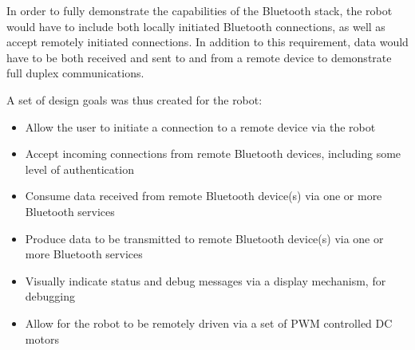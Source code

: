 In order to fully demonstrate the capabilities of the Bluetooth stack, the robot would have to include both locally initiated Bluetooth connections, as well as accept remotely initiated connections. In addition to this requirement, data would have to be both received and sent to and from a remote device to demonstrate full duplex communications.

A set of design goals was thus created for the robot:

\begin{itemize}
	\item Allow the user to initiate a connection to a remote device via the robot
	\item Accept incoming connections from remote Bluetooth devices, including some level of authentication
	\item Consume data received from remote Bluetooth device(s) via one or more Bluetooth services
	\item Produce data to be transmitted to remote Bluetooth device(s) via one or more Bluetooth services
	\item Visually indicate status and debug messages via a display mechanism, for debugging
	\item Allow for the robot to be remotely driven via a set of PWM controlled DC motors
\end{itemize}
